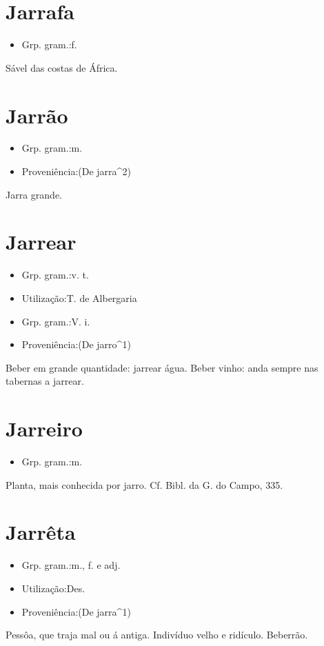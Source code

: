 \documentclass{article}
\begin{document}
\section{Jarrafa}
\begin{itemize}
\item {Grp. gram.:f.}
\end{itemize}
Sável das costas de África.
\section{Jarrão}
\begin{itemize}
\item {Grp. gram.:m.}
\end{itemize}
\begin{itemize}
\item {Proveniência:(De \textunderscore jarra\textunderscore ^2)}
\end{itemize}
Jarra grande.
\section{Jarrear}
\begin{itemize}
\item {Grp. gram.:v. t.}
\end{itemize}
\begin{itemize}
\item {Utilização:T. de Albergaria}
\end{itemize}
\begin{itemize}
\item {Grp. gram.:V. i.}
\end{itemize}
\begin{itemize}
\item {Proveniência:(De \textunderscore jarro\textunderscore ^1)}
\end{itemize}
Beber em grande quantidade: \textunderscore jarrear água\textunderscore .
Beber vinho: \textunderscore anda sempre nas tabernas a jarrear\textunderscore .
\section{Jarreiro}
\begin{itemize}
\item {Grp. gram.:m.}
\end{itemize}
Planta, mais conhecida por \textunderscore jarro\textunderscore . Cf. \textunderscore Bibl. da G. do Campo\textunderscore , 335.
\section{Jarrêta}
\begin{itemize}
\item {Grp. gram.:m., f.  e  adj.}
\end{itemize}
\begin{itemize}
\item {Utilização:Des.}
\end{itemize}
\begin{itemize}
\item {Proveniência:(De \textunderscore jarra\textunderscore ^1)}
\end{itemize}
Pessôa, que traja mal ou á antiga.
Indivíduo velho e ridículo.
Beberrão.
\end{document}
